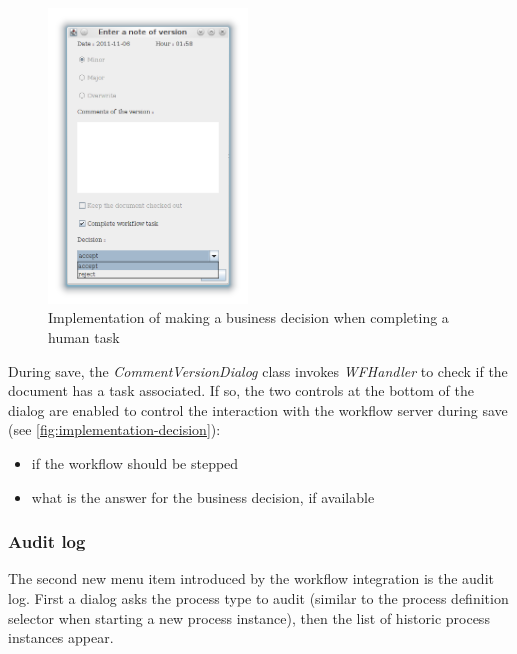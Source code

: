 \begin{figure}[H]
\centering
\includegraphics[width=200px,keepaspectratio]{implementation-decision.png}
\caption{Implementation of making a business decision when completing a human task}
\label{fig:implementation-decision}
\end{figure}

During save, the \emph{CommentVersionDialog} class invokes \emph{WFHandler} to
check if the document has a task associated. If so, the two controls at the
bottom of the dialog are enabled to control the interaction with the workflow
server during save (see \autoref{fig:implementation-decision}):

\begin{itemize}
\item if the workflow should be stepped
\item what is the answer for the business decision, if available
\end{itemize}

\subsubsection*{Audit log}

The second new menu item introduced by the workflow integration is the audit
log. First a dialog asks the process type to audit (similar to the process
definition selector when starting a new process instance), then the list of
historic process instances appear.

